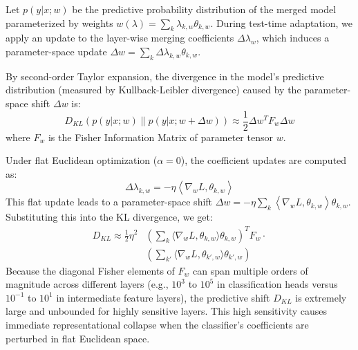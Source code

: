 \documentclass{article}
\theoremstyle{plain}
\theoremstyle{definition}
\theoremstyle{remark}
\begin{document}
Let $p(y|x; w)$ be the predictive probability distribution of the merged model parameterized by weights $w(\lambda) = \sum_k \lambda_{k,w} \theta_{k,w}$. During test-time adaptation, we apply an update to the layer-wise merging coefficients $\Delta \lambda_w$, which induces a parameter-space update $\Delta w = \sum_k \Delta \lambda_{k,w} \theta_{k,w}$.

By second-order Taylor expansion, the divergence in the model's predictive distribution (measured by Kullback-Leibler divergence) caused by the parameter-space shift $\Delta w$ is:
\begin{equation}
  D_{KL}\left( p(y|x; w) \parallel p(y|x; w + \Delta w) \right) \approx \frac{1}{2} \Delta w^T F_w \Delta w
\end{equation}
where $F_w$ is the Fisher Information Matrix of parameter tensor $w$. 

Under flat Euclidean optimization ($\alpha=0$), the coefficient updates are computed as:
\begin{equation}
  \Delta \lambda_{k,w} = -\eta \left\langle \nabla_{w} L, \theta_{k,w} \right\rangle
\end{equation}
This flat update leads to a parameter-space shift $\Delta w = -\eta \sum_k \left\langle \nabla_w L, \theta_{k,w} \right\rangle \theta_{k,w}$. Substituting this into the KL divergence, we get:
\begin{align}
  D_{KL} \approx \frac{1}{2} \eta^2 &\left( \sum_k \langle \nabla_w L, \theta_{k,w} \rangle \theta_{k,w} \right)^T F_w \cdot \nonumber \\
  &\left( \sum_{k'} \langle \nabla_w L, \theta_{k',w} \rangle \theta_{k',w} \right)
\end{align}
Because the diagonal Fisher elements of $F_w$ can span multiple orders of magnitude across different layers (e.g., $10^3$ to $10^5$ in classification heads versus $10^{-1}$ to $10^1$ in intermediate feature layers), the predictive shift $D_{KL}$ is extremely large and unbounded for highly sensitive layers. This high sensitivity causes immediate representational collapse when the classifier's coefficients are perturbed in flat Euclidean space.
\end{document}
